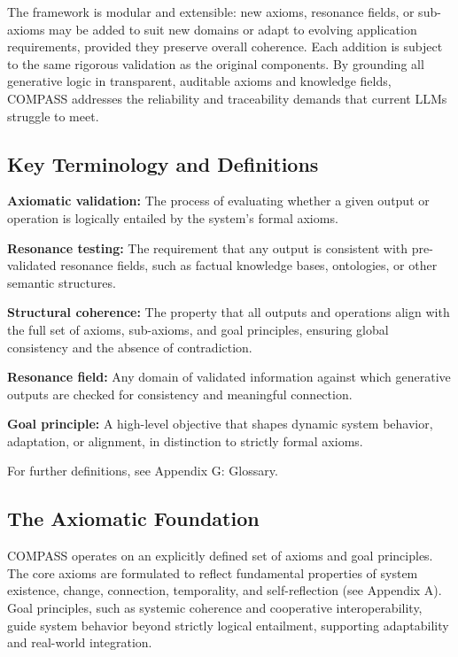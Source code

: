 \documentclass[11pt,a4paper]{article}
\begin{document}
The framework is modular and extensible: new axioms, resonance fields, or sub-axioms may be added to suit new domains or adapt to evolving application requirements, provided they preserve overall coherence. Each addition is subject to the same rigorous validation as the original components. By grounding all generative logic in transparent, auditable axioms and knowledge fields, COMPASS addresses the reliability and traceability demands that current LLMs struggle to meet.

\subsection{Key Terminology and Definitions}

\textbf{Axiomatic validation:} The process of evaluating whether a given output or operation is logically entailed by the system's formal axioms.

\textbf{Resonance testing:} The requirement that any output is consistent with pre-validated resonance fields, such as factual knowledge bases, ontologies, or other semantic structures.

\textbf{Structural coherence:} The property that all outputs and operations align with the full set of axioms, sub-axioms, and goal principles, ensuring global consistency and the absence of contradiction.

\textbf{Resonance field:} Any domain of validated information against which generative outputs are checked for consistency and meaningful connection.

\textbf{Goal principle:} A high-level objective that shapes dynamic system behavior, adaptation, or alignment, in distinction to strictly formal axioms.

For further definitions, see Appendix G: Glossary.

\subsection{The Axiomatic Foundation}

COMPASS operates on an explicitly defined set of axioms and goal principles. The core axioms are formulated to reflect fundamental properties of system existence, change, connection, temporality, and self-reflection (see Appendix A). Goal principles, such as systemic coherence and cooperative interoperability, guide system behavior beyond strictly logical entailment, supporting adaptability and real-world integration.
\end{document}
